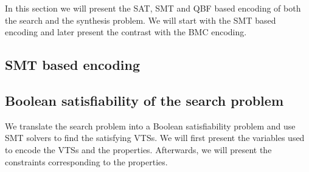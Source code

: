 In this section we will present the SAT, SMT and QBF based encoding of both the search and the synthesis problem. We will start with the SMT based encoding and later present the contrast with the BMC encoding.

\subsection{SMT based encoding}

\subsection{Boolean satisfiability of the search problem}

We translate the search problem into a Boolean satisfiability
problem and use SMT solvers to find the satisfying VTSs.
%
We will first present the variables used to encode the
VTSs and the properties.
%
Afterwards, we will present the constraints corresponding to the
properties.


